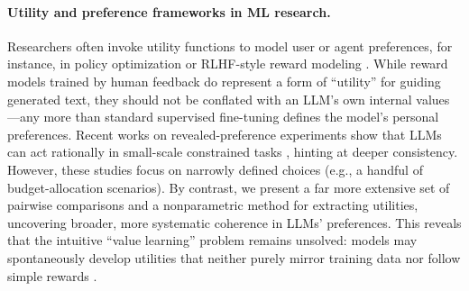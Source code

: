\paragraph{Utility and preference frameworks in ML research.} Researchers often invoke utility functions to model user or agent preferences, for instance, in policy optimization or RLHF-style reward modeling 
\citep{christiano2017deep, harsanyi1955cardinal} . While reward models trained by human feedback do represent a form of ``utility'' for guiding generated text, they should not be conflated with an LLM’s own internal values—any more than standard supervised fine-tuning defines the model’s personal preferences. Recent works on revealed-preference experiments show that LLMs can act rationally in small-scale constrained tasks \citep{raman2024steerassessingeconomicrationality,chen2023emergenceeconomicrationalitygpt,kim2024learninghomoeconomicusllm}, hinting at deeper consistency. However, these studies focus on narrowly defined choices (e.g., a handful of budget-allocation scenarios). By contrast, we present a far more extensive set of pairwise comparisons and a nonparametric method for extracting utilities, uncovering broader, more systematic coherence in LLMs’ preferences. This reveals that the intuitive ``value learning'' problem remains unsolved: models may spontaneously develop utilities that neither purely mirror training data nor follow simple rewards \citep{hendrycks2023natural}.































